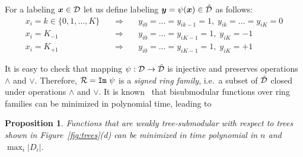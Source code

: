 \documentclass[11pt,onecolumn]{article}
\newtheorem{proposition}[theorem]{Proposition}
\def\D{{\cal D}}
\def\calR{{\cal R}}
\newcommand{\bx}{\mbox{\boldmath $x$}}
\newcommand{\by}{\mbox{\boldmath $y$}}
\begin{document}
For a labeling $\bx\in \D$ let us define labeling $\by=\psi(\bx)\in\tilde \D$ as follows:
\begin{eqnarray*}
x_i=k\in\{0,1,\ldots,K\} & \quad \Rightarrow \quad & y_{i0}=\ldots=y_{ik-1}=1 , \; y_{ik}=\ldots=y_{iK}=0 \\
x_i=K_{-1} \hspace{60pt} & \quad \Rightarrow \quad & y_{i0}=\ldots=y_{iK-1}=1 , \; y_{iK}=-1 \\
x_i=K_{+1}\hspace{60pt} & \quad \Rightarrow \quad & y_{i0}=\ldots=y_{iK-1}=1 , \; y_{iK}=+1 
\end{eqnarray*}
It is easy to check that mapping $\psi:\D\rightarrow \tilde \D$ is injective and preserves operations $\wedge$ and $\vee$.
Therefore, $\calR={\tt Im}~ \psi$ is a {\em signed ring family}, i.e.\ a subset of $\tilde \D$ closed under operations $\wedge$ and $\vee$.
It is known~\cite{McCormick:10} that bisubmodular functions over ring families can be minimized in polynomial time, leading to
\begin{proposition}
Functions that are weakly tree-submodular with respect to trees shown in Figure~\ref{fig:trees}(d) can be minimized
in time polynomial in $n$ and $\max_i |D_i|$.
\end{proposition}
\end{document}
